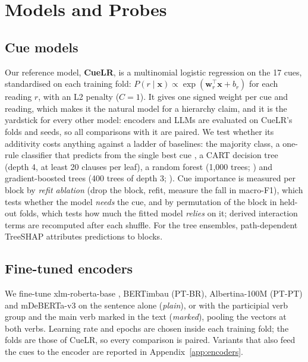 \documentclass[11pt]{article}
\begin{document}
\section{Models and Probes}
\label{sec:models}

\subsection{Cue models}
\label{sec:cuemodels}
Our reference model, \textbf{CueLR}, is a multinomial logistic regression on the 17 cues, standardised on each training fold: $P(r \mid \mathbf{x}) \propto \exp(\mathbf{w}_r^{\top}\mathbf{x} + b_r)$ for each reading $r$, with an L2 penalty ($C = 1$). It gives one signed weight per cue and reading, which makes it the natural model for a hierarchy claim, and it is the yardstick for every other model: encoders and LLMs are evaluated on CueLR's folds and seeds, so all comparisons with it are paired. We test whether its additivity costs anything against a ladder of baselines: the majority class, a one-rule classifier that predicts from the single best cue \citep{holte1993}, a CART decision tree (depth 4, at least 20 clauses per leaf), a random forest (1,000 trees; \citealp{breiman2001}) and gradient-boosted trees (400 trees of depth 3; \citealp{chen2016}). Cue importance is measured per block by \emph{refit ablation} (drop the block, refit, measure the fall in macro-F1), which tests whether the model \emph{needs} the cue, and by permutation of the block in held-out folds, which tests how much the fitted model \emph{relies} on it; derived interaction terms are recomputed after each shuffle. For the tree ensembles, path-dependent TreeSHAP \citep{lundberg2020} attributes predictions to blocks.

\subsection{Fine-tuned encoders}
We fine-tune xlm-roberta-base \citep{conneau2020xlmr}, BERTimbau (PT-BR), Albertina-100M (PT-PT) and mDeBERTa-v3 \citep{he2023debertav3} on the sentence alone (\emph{plain}), or with the participial verb group and the main verb marked in the text (\emph{marked}), pooling the vectors at both verbs. Learning rate and epochs are chosen inside each training fold; the folds are those of CueLR, so every comparison is paired. Variants that also feed the cues to the encoder are reported in Appendix~\ref{app:encoders}.
\end{document}
